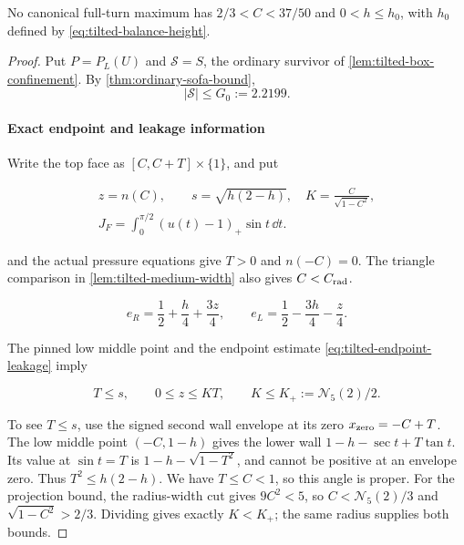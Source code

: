 \begin{lemma}\label{lem:tilted-small-height}
No canonical full-turn maximum has $2/3<C<37/50$ and
$0<h\le h_0$, with $h_0$ defined by \eqref{eq:tilted-balance-height}.
\end{lemma}
\begin{proof}
Put $P=P_L(U)$ and $\mathcal S=S$, the ordinary survivor of
\cref{lem:tilted-box-confinement}. By \cref{thm:ordinary-sofa-bound},
\begin{equation}\label{eq:tilted-sh-2}
 |\mathcal S|\le G_0:=2.2199.
\end{equation}
\paragraph{Exact endpoint and leakage information}

Write the top face as \([C,C+T]\times\{1\}\), and put

\[
\begin{gathered}
z=n(C),\qquad s=\sqrt{h(2-h)},\quad
K=\frac{C}{\sqrt{1-C^2}},\\
J_F=\int_0^{\pi/2}(u(t)-1)_+\sin t\,\dd t.
\end{gathered}
\]

 and the actual pressure equations give
\(T>0\) and \(n(-C)=0\). The triangle comparison in
\cref{lem:tilted-medium-width} also gives \(C<C_{\rm rad}\).

\begin{equation}\label{eq:tilted-sh-3}
e_R=\frac12+\frac h4+\frac{3z}{4},\qquad
e_L=\frac12-\frac{3h}{4}-\frac z4.
\end{equation}

The pinned low middle point and the endpoint estimate \eqref{eq:tilted-endpoint-leakage} imply

\begin{equation}\label{eq:tilted-sh-4}
T\le s,\qquad 0\le z\le KT,\qquad K\le K_+:=\mathcal N_5(2)/2.
\end{equation}

To see $T\le s$, use the signed second
wall envelope at its zero \(x_{\rm zero}=-C+T\). The low middle point
\((-C,1-h)\) gives the lower wall
\(1-h-\sec t+T\tan t\). Its value at \(\sin t=T\) is
\(1-h-\sqrt{1-T^2}\), and cannot be positive at an envelope zero.
Thus \(T^2\le h(2-h)\). We have \(T\le C<1\), so this angle is
proper. For the projection bound, the radius-width cut gives $9C^2<5$,
so $C<\mathcal N_5(2)/3$ and $\sqrt{1-C^2}>2/3$.
Dividing gives exactly $K<K_+$; the same radius supplies both bounds.


\end{proof}

